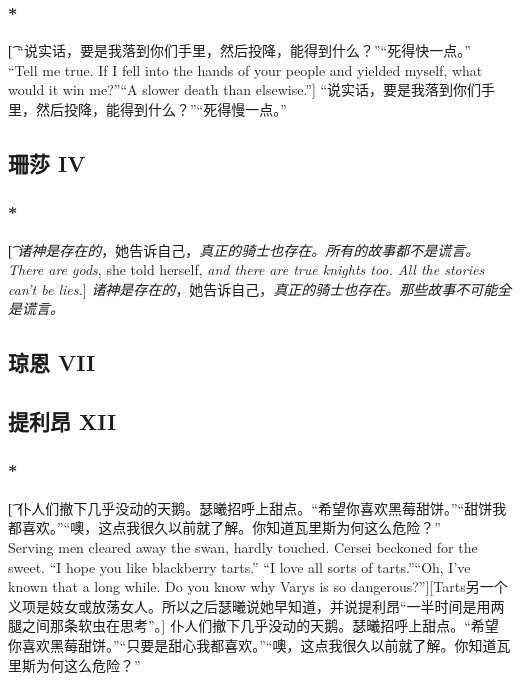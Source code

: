 \documentclass[12pt,a4paper]{article}
\begin{document}
\subsubsection{\color{red}*}\t[
“说实话，要是我落到你们手里，然后投降，能得到什么？”“死得快一点。”\\
“Tell me true. If I fell into the hands of your people and yielded myself, what would it win me?”“A slower death than elsewise.”]
“说实话，要是我落到你们手里，然后投降，能得到什么？”“死得慢一点。”

\subsection{珊莎 IV}

\subsubsection{\color{red}*}\t[
	\emph{诸神是存在的}，她告诉自己，\emph{真正的骑士也存在。所有的故事都不是谎言。}\\
	\emph{There are gods}, she told herself, \emph{and there are true knights too. All the stories can't be lies.}]
	\emph{诸神是存在的}，她告诉自己，\emph{真正的骑士也存在。那些故事不可能全是谎言。}

\subsection{琼恩 VII}

\subsection{提利昂 XII}

\subsubsection{\color{red}*}\t[
	仆人们撤下几乎没动的天鹅。瑟曦招呼上甜点。“希望你喜欢黑莓甜饼。”“甜饼我都喜欢。”“噢，这点我很久以前就了解。你知道瓦里斯为何这么危险？”\\
	Serving men cleared away the swan, hardly touched. Cersei beckoned for the sweet. “I hope
	you like blackberry tarts.”	“I love all sorts of tarts.”“Oh, I've known that a long while. Do you know why Varys is so dangerous?”][Tarts另一个义项是妓女或放荡女人。所以之后瑟曦说她早知道，并说提利昂“一半时间是用两腿之间那条软虫在思考”。]
	仆人们撤下几乎没动的天鹅。瑟曦招呼上甜点。“希望你喜欢黑莓甜饼。”“只要是甜心我都喜欢。”“噢，这点我很久以前就了解。你知道瓦里斯为何这么危险？”
	
\end{document}
